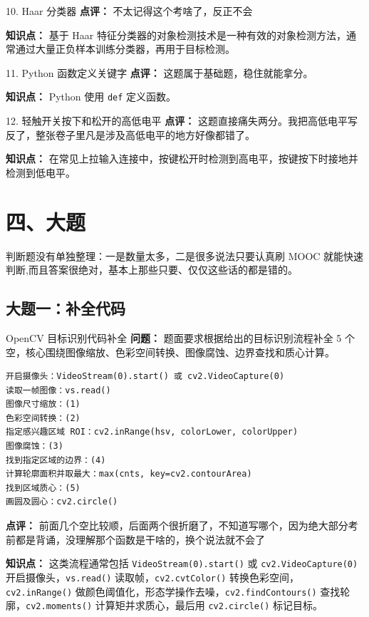 \begin{question}{10. Haar 分类器}
\textbf{点评：} 不太记得这个考啥了，反正不会

\textbf{知识点：} 基于 Haar 特征分类器的对象检测技术是一种有效的对象检测方法，通常通过大量正负样本训练分类器，再用于目标检测。
\end{question}

\begin{question}{11. Python 函数定义关键字}
\textbf{点评：} 这题属于基础题，稳住就能拿分。

\textbf{知识点：} Python 使用 \texttt{def} 定义函数。
\end{question}

\begin{question}{12. 轻触开关按下和松开的高低电平}
\textbf{点评：} 这题直接痛失两分。我把高低电平写反了，整张卷子里凡是涉及高低电平的地方好像都错了。

\textbf{知识点：} 在常见上拉输入连接中，按键松开时检测到高电平，按键按下时接地并检测到低电平。
\end{question}

\section{四、大题}

判断题没有单独整理：一是数量太多，二是很多说法只要认真刷 MOOC 就能快速判断,而且答案很绝对，基本上那些只要、仅仅这些话的都是错的。

\subsection{大题一：补全代码}

\begin{question}{OpenCV 目标识别代码补全}
\textbf{问题：} 题面要求根据给出的目标识别流程补全 5 个空，核心围绕图像缩放、色彩空间转换、图像腐蚀、边界查找和质心计算。

\begin{verbatim}
开启摄像头：VideoStream(0).start() 或 cv2.VideoCapture(0)
读取一帧图像：vs.read()
图像尺寸缩放：(1)
色彩空间转换：(2)
指定感兴趣区域 ROI：cv2.inRange(hsv, colorLower, colorUpper)
图像腐蚀：(3)
找到指定区域的边界：(4)
计算轮廓面积并取最大：max(cnts, key=cv2.contourArea)
找到区域质心：(5)
画圆及圆心：cv2.circle()
\end{verbatim}

\textbf{点评：} 前面几个空比较顺，后面两个很折磨了，不知道写哪个，因为绝大部分考前都是背诵，没理解那个函数是干啥的，换个说法就不会了

\textbf{知识点：} 这类流程通常包括 \texttt{VideoStream(0).start()} 或 \texttt{cv2.VideoCapture(0)} 开启摄像头，\texttt{vs.read()} 读取帧，\texttt{cv2.cvtColor()} 转换色彩空间，\texttt{cv2.inRange()} 做颜色阈值化，形态学操作去噪，\texttt{cv2.findContours()} 查找轮廓，\texttt{cv2.moments()} 计算矩并求质心，最后用 \texttt{cv2.circle()} 标记目标。
\end{question}

